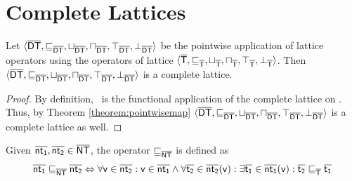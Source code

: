 \documentclass{llncs}
\begin{document}
\section{Complete Lattices}

\begin{lemma}
\label{lemma:dynamictyping}
Let $\langle \mathsf{\overline{DT}}, \sqsubseteq_{\mathsf{\overline{DT}}}, \sqcup_{\mathsf{\overline{DT}}}, \sqcap_{\mathsf{\overline{DT}}}, \top_{\mathsf{\overline{DT}}}, \bot_{\mathsf{\overline{DT}}} \rangle$ be the pointwise application of lattice operators using the operators of lattice $\langle \mathsf{\overline{T}}, \sqsubseteq_{\mathsf{\overline{T}}}, \sqcup_{\mathsf{\overline{T}}}, \sqcap_{\mathsf{\overline{T}}}, \top_{\mathsf{\overline{T}}}, \bot_{\mathsf{\overline{T}}} \rangle$.
Then $\langle \mathsf{\overline{DT}}, \sqsubseteq_{\mathsf{\overline{DT}}}, \sqcup_{\mathsf{\overline{DT}}}, \sqcap_{\mathsf{\overline{DT}}}, \top_{\mathsf{\overline{DT}}}, \bot_{\mathsf{\overline{DT}}} \rangle$ is a complete lattice.

\begin{proof}
By definition, \dynamictype\ is the functional application of the complete lattice on \types. Thus, by Theorem \ref{theorem:pointwisemap} $\langle \mathsf{\overline{DT}}, \sqsubseteq_{\mathsf{\overline{DT}}}, \sqcup_{\mathsf{\overline{DT}}}, \sqcap_{\mathsf{\overline{DT}}}, \top_{\mathsf{\overline{DT}}}, \bot_{\mathsf{\overline{DT}}} \rangle$ is a complete lattice as well.
\end{proof}

\end{lemma}

\begin{definition}[$\aorder_{\nottype}$]
\label{definition:partialordernottype}
Given $\mathsf{\overline{nt_1}}, \mathsf{\overline{nt_2}} \in \mathsf{\overline{NT}}$, the operator $\aorder_{\nottype}$ is defined as
\[
\mathsf{\overline{nt_1}} \sqsubseteq_{\mathsf{\overline{NT}}} \mathsf{\overline{nt_2}} \Leftrightarrow \forall \mathsf{v} \in \mathsf{\overline{nt_2}} : \mathsf{v} \in \mathsf{\overline{nt_1}} \land \forall \mathsf{\overline{t_2}} \in \mathsf{\overline{nt_2}}(\mathsf{v}) : \exists \mathsf{\overline{t_1}} \in \mathsf{\overline{nt_1}}(\mathsf{v}) : \mathsf{\overline{t_2}} \sqsubseteq_{\mathsf{\overline{T}}} \mathsf{\overline{t_1}}
\]
\end{definition}
\end{document}

